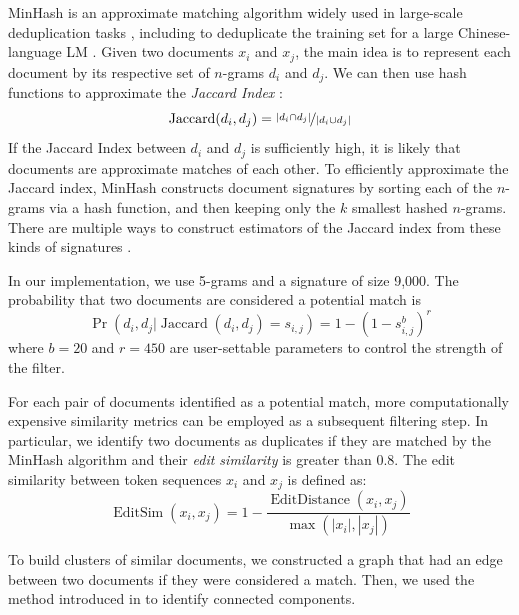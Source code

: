 MinHash \citep{broder1997resemblance} is an approximate matching algorithm widely used in large-scale deduplication tasks \citep{versley2012not,GABRIEL201863,gyawali2020deduplication}, including to deduplicate the training set for a large Chinese-language LM \citep{zeng2021pangualpha}.
Given two documents $x_i$ and $x_j$, the main idea is to represent each document by its respective set of $n$-grams $d_i$ and $d_j$.
We can then use hash functions to approximate the \emph{Jaccard Index} \citep{jaccard1912distribution}:
\begin{equation}
\operatorname{Jaccard}(d_i, d_j) = \nicefrac{|d_i \cap d_j|}{|d_i \cup d_j|}
\end{equation}
If the Jaccard Index between $d_i$ and $d_j$ is sufficiently high, it is likely that documents are approximate matches of each other.
To efficiently approximate the Jaccard index, MinHash constructs document signatures by sorting each of the $n$-grams via a hash function, and then keeping only the $k$ smallest hashed $n$-grams.
There are multiple ways to construct estimators of the Jaccard index from these kinds of signatures \citep{cohen2016min}.

In our implementation, we use 5-grams and a signature of size 9,000. The probability that two documents are considered a potential match is
\begin{equation}
\operatorname{Pr}(d_i, d_j | \operatorname{Jaccard}(d_i, d_j) = s_{i, j}) = 1 - (1 - s_{i, j}^b)^r
\end{equation}
where $b=20$ and $r=450$ are user-settable parameters to control the strength of the filter.

For each pair of documents identified as a potential match, more computationally expensive similarity metrics can be employed as a subsequent filtering step.
In particular, we identify two documents as duplicates if they are matched by the MinHash algorithm and their \emph{edit similarity} is greater than 0.8. The edit similarity between token sequences $x_i$ and $x_j$ is defined as:
\begin{equation}
    \operatorname{EditSim}(x_i, x_j) = 1 - \frac{\operatorname{EditDistance}(x_i, x_j)}{\max(|x_i|, |x_j|)}
\end{equation}

\noindent To build clusters of similar documents, we constructed a graph that had an edge between two documents if they were considered a match. Then, we used the method introduced in \citet{lacki2018connected} to identify  connected components.
%

